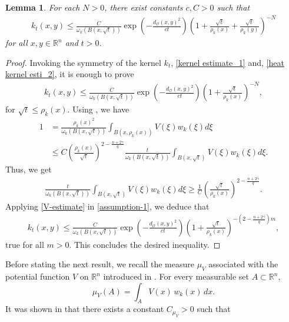 \documentclass[11pt, reqno]{amsproc}
\newtheorem{lemma}[theorem]{Lemma}
\theoremstyle{definition}
\theoremstyle{remark}
\numberwithin{equation}{section}
\begin{document}
 \begin{lemma}\label{k-kernel-estimate}
     For each $N>0$, there exist constants $c,C>0$ such that 
     \begin{align}\label{k-kernel-estimate}
         k_t(x,y) \leq \frac{C}{\omega_k(B(x,\sqrt{t}))} \exp\left(-\frac{d_\mathcal{O}(x,y)^2}{ct} \right) \left( 1+ \frac{\sqrt{t}}{\rho_k(x)}+ \frac{\sqrt{t}}{\rho_k(y)} \right)^{-N} 
     \end{align} for all $x,y\in \mathbb{R}^n$ and $t>0$.
 \end{lemma}
\begin{proof}
   Invoking the symmetry of the kernel $k_t$, \eqref{kernel estimate_1} and, \eqref{heat kernel esti_2}, it is enough to prove 
    \begin{align*}
        k_t(x,y) \leq \frac{C}{\omega_k(B(x,\sqrt{t}))} \exp\left(-\frac{d_\mathcal{O}(x,y)^2}{ct} \right) \left( 1+ \frac{\sqrt{t}}{\rho_k(x)} \right)^{-N}, 
    \end{align*} for $\sqrt{t} \leq \rho_k(x)$. Using  \cite[Lemma 7]{Hejna-2021}, we have 
    \begin{align*}
        1 &= \frac{\rho_k(x)^2}{\omega_k(B(x,\sqrt{t}))}\int_{B(x,\rho_k(x))} V(\xi)w_k(\xi)d\xi\\
       & \leq C \left(\frac{\rho_k(x)}{\sqrt{t}}\right)^{2-\frac{n+2\gamma}{q}} \frac{t}{\omega_k(B(x,\sqrt{t}))}\int_{B(x,\sqrt{t})} V(\xi)w_k(\xi)d\xi.
    \end{align*} Thus, we get 
    \begin{align} \label{V-estimate}
      \frac{t}{\omega_k(B(x,\sqrt{t}))}\int_{B(x,\sqrt{t})} V(\xi)w_k(\xi)d\xi \geq   \frac{1}{C }  \left(\frac{\sqrt{t}}{\rho_k(x)}\right)^{2-\frac{n+2\gamma}{q}}.  
    \end{align} Applying \eqref{V-estimate} in \eqref{assumption-1}, we deduce that 
    \begin{align*}
        k_t(x,y) \leq \frac{C}{\omega_k(B(x,\sqrt{t}))} \exp\left(-\frac{d_\mathcal{O}(x,y)^2}{ct} \right) \left( 1+ \frac{\sqrt{t}}{\rho_k(x)} \right)^{-\left({2-\frac{n+2\gamma}{q}}\right)m}, 
    \end{align*} true for all $m>0$. This concludes the desired inequality.
\end{proof}
Before stating the next result, we recall the measure $\mu_V$ associated with the potential function $V$ on $\mathbb{R}^n$ introduced in \cite{Hejna-2021}. For every measurable set $A\subset \mathbb{R}^n$,
\[
\mu_V(A)=\int_A V(x)\,w_k(x)\,dx.
\]
It was shown in \cite{Hejna-2021} that there exists a constant $C_{\mu_V}>0$ such that
\end{document}
